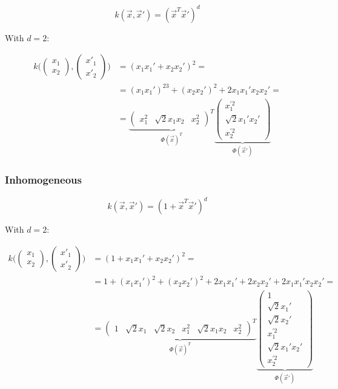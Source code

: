 		$$k(\vec{x},\vec{x}') = (\vec{x}^T\vec{x}')^d$$

		With $d=2$:

		\begin{align*}
			k\biggl(\begin{pmatrix}x_1\\x_2\end{pmatrix},\begin{pmatrix}x'_1\\x'_2\end{pmatrix}\biggr) &=(x_1x_1'+x_2x_2')^2 =\\
																																																 &=(x_1x_1')^23+(x_2x_2')^2+2x_1x_1'x_2x_2'=\\
																																																 &=\underbrace{\begin{pmatrix}x_1^2 &\sqrt{2}x_1x_2&x_2^2\end{pmatrix}^T}_{\Phi(\vec{x})^T}\underbrace{\begin{pmatrix}x_1^{'2}\\\sqrt{2}x_1'x_2'\\x_2^{'2}\end{pmatrix}}_{\Phi(\vec{x}')}
		\end{align*}

		\subsubsection{Inhomogeneous}

		$$k(\vec{x},\vec{x}') = (1+\vec{x}^T\vec{x}')^d$$

		With $d = 2$:

		\begin{align*}
			k\biggl(\begin{pmatrix}x_1\\x_2\end{pmatrix},\begin{pmatrix}x'_1\\x'_2\end{pmatrix}\biggr) &=(1+x_1x_1'+x_2x_2')^2 =\\
																																																 &=1+ (x_1x_1')^2+(x_2x_2')^2+2x_1x_1' +2x_2x_2'+2x_1x_1'x_2x_2'=\\
																																																 &=\underbrace{\begin{pmatrix}1&\sqrt{2}x_1 &\sqrt{2}x_2 &x_1^2 &\sqrt{2}x_1x_2 &x_2^2\end{pmatrix}^T}_{\Phi(\vec{x})^T}\underbrace{\begin{pmatrix}1\\\sqrt{2}x_1'\\\sqrt{2}x_2'\\x_1^{'2}\\\sqrt{2}x_1'x_2'\\x_2^{'2}\end{pmatrix}}_{\Phi(\vec{x}')}
		\end{align*}


